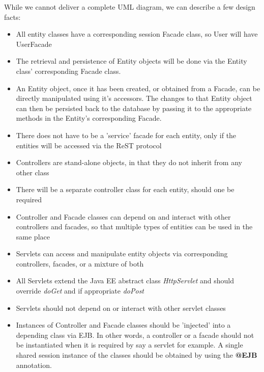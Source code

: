 While we cannot deliver a complete UML diagram, we can describe a few design facts:
\\
\begin{itemize}
\item All entity classes have a corresponding session Facade class, so User will have UserFacade
\item The retrieval and persistence of Entity objects will be done via the Entity class' corresponding Facade class.
\item An Entity object, once it has been created, or obtained from a Facade, can be directly manipulated using it's accessors. The changes to that Entity object can then be persisted back to the database by passing it to the appropriate methods in the Entity's corresponding Facade.
\item There does not have to be a 'service' facade for each entity, only if the entities will be accessed via the ReST protocol
\item Controllers are stand-alone objects, in that they do not inherit from any other class
\item There will be a separate controller class for each entity, should one be required
\item Controller and Facade classes can depend on and interact with other controllers and facades, so that multiple types of entities can be used in the same place
\item Servlets can access and manipulate entity objects via corresponding controllers, facades, or a mixture of both
\item All Servlets extend the Java EE abstract class \textit{HttpServlet} and should override \textit{doGet} and if appropriate \textit{doPost}
\item Servlets should not depend on or interact with other servlet classes
\item Instances of Controller and Facade classes should be 'injected' into a depending class via EJB. In other words, a controller or a facade should not be instantiated when it is required by say a servlet for example. A single shared session instance of the classes should be obtained by using the \textbf{@EJB} annotation.
\end{itemize}

\clearpage

